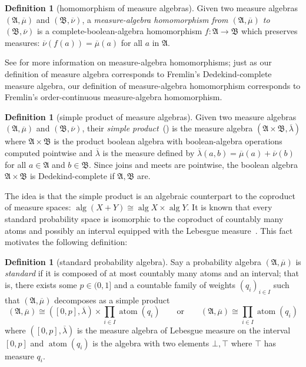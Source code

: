 \documentclass[
  sigconf,
  screen, ]{acmart}
\theoremstyle{definition}
\newtheorem{definition}[theorem]{Definition}
\newcommand\frakA{\mathfrak A}
\newcommand\frakB{\mathfrak B}
\newcommand\fremlin[1]{\citet[#1]{fremlin2000measure}}
\newcommand\fremlinft[3]{\citet[\href{https://www1.essex.ac.uk/maths/people/fremlin/chap#2.pdf\#page=#3}{#1}]{fremlin2000measure}}
\newcommand\nref[2]{\hyperref[#1]{#2}} \newcommand\checkhigh{{\huge{\color{red}\textbf{TODO: check}}}}
\newcommand\measalg{\operatorname{\nref{app:cons:measalg}{alg}}}
\newcommand\atom[1]{\operatorname{atom}(#1)}
\begin{document}
\begin{definition}[homomorphism of measure algebras] \label{app:def:measalg-hom}
  Given two measure algebras $(\frakA,\overline\mu)$
  and $(\frakB,\overline\nu)$,
  a \emph{measure-algebra homomorphism from $(\frakA,\overline\mu)$
  to $(\frakB,\overline\nu)$}
  is a complete-boolean-algebra homomorphism
  $f : \frakA\to\frakB$
  which preserves measures: $\overline\nu(f(a)) = \overline\mu(a)$
  for all $a$ in $\frakA$.
\end{definition}

See \fremlinft{324I}{32}{25} for more information on measure-algebra
homomorphisms; just as our definition of measure algebra
corresponds to Fremlin's Dedekind-complete measure algebra,
our definition of measure-algebra homomorphism
corresponds to Fremlin's order-continuous
measure-algebra homomorphism.

\begin{definition}[simple product of measure algebras] \label{app:def:measalg-simple-product}
  Given two measure algebras $(\frakA,\overline\mu)$
  and $(\frakB,\overline\nu)$,
  their \emph{simple product}~(\fremlin{\href{https://www1.essex.ac.uk/maths/people/fremlin/chap32.pdf\#page=9}{322L}})
  is the measure algebra $(\frakA\times\frakB,\overline\lambda)$
  where $\frakA\times\frakB$ is the product boolean algebra
  with boolean-algebra operations computed pointwise
  and $\overline\lambda$ is the measure defined by
  $\overline\lambda(a, b) = \overline\mu(a) + \overline\nu(b)$
  for all $a\in\frakA$ and $b\in\frakB$.
  Since joins and meets are pointwise,
  the boolean algebra $\frakA\times\frakB$
  is Dedekind-complete if $\frakA,\frakB$
  are.
\end{definition}

The idea is that the simple product
is an algebraic counterpart to the coproduct
of measure spaces: $\measalg(X + Y) \cong \measalg X\times\measalg Y$.
It is known that every standard probability space
is isomorphic to the coproduct of countably many atoms
and possibly an interval equipped with the Lebesgue measure~\cite[p. 25, \S 2]{rohlin1949fundamental}.
This fact motivates the following definition:

\begin{definition}[standard probability algebra] \label{app:def:stdprobalg-def}
  Say a probability algebra
  $(\frakA,\overline\mu)$
  is \emph{standard}
  if it is composed of at most countably many atoms
  and an interval; that is, there exists some $p\in(0,1]$ 
  and a countable family of weights $(q_i)_{i\in I}$
  such that $(\frakA,\overline\mu)$
  decomposes as a simple product
  \[ (\frakA,\overline\mu) \cong ([0,p],\overline\lambda) \times \prod_{i\in I} \atom{q_i}
  \qquad\text{or}\qquad
  (\frakA,\overline\mu) \cong \prod_{i\in I} \atom{q_i}
  \]
  where
  $([0,p],\overline\lambda)$ is the measure algebra of Lebesgue measure on the interval $[0,p]$
  and $\atom {q_i}$ is
  the algebra with two elements $\bot,\top$ where $\top$ has measure $q_i$.
\end{definition}
\end{document}
